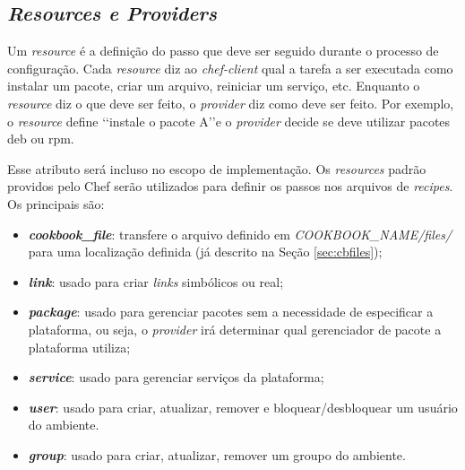 
\subsection{\textit{Resources e Providers}}
\label{sec:cbresource}

Um \textit{resource} é a definição do passo que deve ser seguido durante o processo
de configuração. Cada \textit{resource} diz ao \textit{chef-client} qual a tarefa a ser executada
como instalar um pacote, criar um arquivo, reiniciar um serviço, etc.
Enquanto o \textit{resource} diz o que deve ser feito, o \textit{provider} diz como deve ser
feito. Por exemplo, o \textit{resource} define \lq\lq instale o pacote A\rq\rq e o \textit{provider} decide
se deve utilizar pacotes deb ou rpm.

Esse atributo será incluso no escopo de implementação. Os \textit{resources} padrão
providos pelo Chef serão utilizados para definir os passos nos arquivos de
\textit{recipes}. Os principais são:

\begin{itemize}
  \item \textit{\textbf{cookbook\_file}}: transfere o arquivo definido em \textit{COOKBOOK\_NAME/files/} para
    uma localização definida (já descrito na Seção \ref{sec:cbfiles});
  \item \textit{\textbf{link}}: usado para criar \textit{links} simbólicos ou real;
  \item \textit{\textbf{package}}: usado para gerenciar pacotes sem a necessidade de especificar a plataforma,
    ou seja, o \textit{provider} irá determinar qual gerenciador de pacote a plataforma utiliza;
  \item \textit{\textbf{service}}: usado para gerenciar serviços da plataforma;
  \item \textit{\textbf{user}}: usado para criar, atualizar, remover e bloquear/desbloquear um usuário do ambiente.
  \item \textit{\textbf{group}}: usado para criar, atualizar, remover um groupo do ambiente.
\end{itemize}
